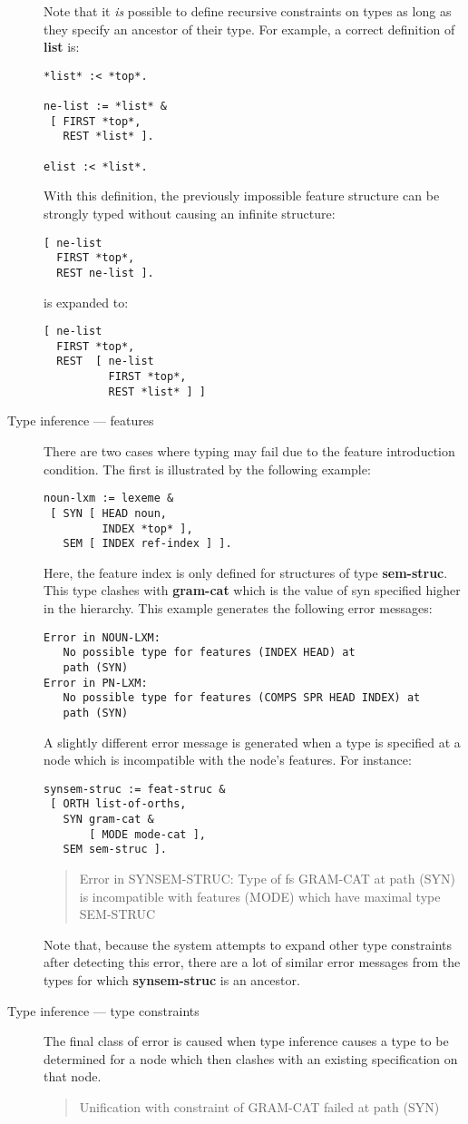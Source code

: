 \documentclass[12pt]{report}
\newenvironment{error}%
{\begin{quote}
\tt
}%
{\end{quote}
}
\begin{document}
\begin{description}
Note that it {\em is} 
possible to define recursive constraints on
types as long as they specify an ancestor of their type.
For example, a correct
definition of {\bf list} is:
\begin{verbatim} 
*list* :< *top*.

ne-list := *list* &
 [ FIRST *top*,
   REST *list* ].

elist :< *list*.
\end{verbatim}
With this definition, the previously impossible feature structure 
can be strongly typed without causing an infinite structure:
\begin{verbatim}
[ ne-list 
  FIRST *top*,
  REST ne-list ].
\end{verbatim}
is expanded to:
\begin{verbatim}
[ ne-list 
  FIRST *top*,
  REST  [ ne-list
          FIRST *top*,
          REST *list* ] ]
\end{verbatim}
\item[Type inference --- features]
There are two cases where typing may fail due to
the feature introduction condition.  The first is illustrated
by the following example:
\begin{verbatim}
noun-lxm := lexeme &
 [ SYN [ HEAD noun,
         INDEX *top* ],
   SEM [ INDEX ref-index ] ].
\end{verbatim}
Here, the feature {\sc index} is only defined for structures of type
{\bf sem-struc}.  This type clashes with {\bf gram-cat} which is
the value of {\sc syn} specified
higher in the hierarchy.
This example generates the following error messages:
\begin{verbatim}
Error in NOUN-LXM:
   No possible type for features (INDEX HEAD) at 
   path (SYN)
Error in PN-LXM:
   No possible type for features (COMPS SPR HEAD INDEX) at 
   path (SYN)
\end{verbatim}

A slightly different error message
is generated when a type is specified at a node which is incompatible
with the node's features.  For instance:
\begin{verbatim}
synsem-struc := feat-struc &
 [ ORTH list-of-orths,
   SYN gram-cat & 
       [ MODE mode-cat ],
   SEM sem-struc ].
\end{verbatim}
\begin{error}
Error in SYNSEM-STRUC:
  Type of fs GRAM-CAT at path (SYN) is incompatible with features (MODE) which have maximal type SEM-STRUC
\end{error}
Note that, because the system attempts to expand other
type constraints after detecting this error,
there are a lot of similar error messages from the types for which
{\bf synsem-struc} is an ancestor.

\item[Type inference --- type constraints]
The final class of error is caused when type inference causes a
type to be determined for a node which then clashes with an existing
specification on that node.  
\begin{error}
Unification with constraint of GRAM-CAT failed at path (SYN)
\end{error}
\end{description}
\end{document}
